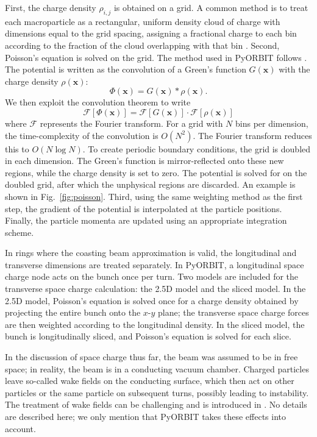 First, the charge density $\rho_{i,j}$ is obtained on a grid. A common method is to treat each macroparticle as a rectangular, uniform density cloud of charge with dimensions equal to the grid spacing, assigning a fractional charge to each bin according to the fraction of the cloud overlapping with that bin \cite{Birdsall1975}. Second, Poisson’s equation is solved on the grid. The method used in PyORBIT follows \cite{Hockney1981}. The potential is written as the convolution of a Green's function $G(\mathbf{x})$ with the charge density $\rho(\mathbf{x})$:
%
\begin{equation}
    \Phi(\mathbf{x}) = G(\mathbf{x}) * \rho(\mathbf{x}).
\end{equation}
%
We then exploit the convolution theorem \cite{Arfken1985} to write
%
\begin{equation}
    \mathcal{F}[\Phi(\mathbf{x})]
    =
    \mathcal{F}[G(\mathbf{x})] \cdot \mathcal{F}[\rho(\mathbf{x})]
\end{equation}
%
where $\mathcal{F}$ represents the Fourier transform. For a grid with $N$ bins per dimension, the time-complexity of the convolution is $O(N^2)$. The Fourier transform reduces this to $O(N \log N)$. To create periodic boundary conditions, the grid is doubled in each dimension. The Green's function is mirror-reflected onto these new regions, while the charge density is set to zero. The potential is solved for on the doubled grid, after which the unphysical regions are discarded. An example is shown in Fig.~\ref{fig:poisson}. Third, using the same weighting method as the first step, the gradient of the potential is interpolated at the particle positions. Finally, the particle momenta are updated using an appropriate integration scheme. 

In rings where the coasting beam approximation is valid, the longitudinal and transverse dimensions are treated separately. In PyORBIT, a longitudinal space charge node acts on the bunch once per turn. Two models are included for the transverse space charge calculation: the 2.5D model and the sliced model. In the 2.5D model, Poisson’s equation is solved once for a charge density obtained by projecting the entire bunch onto the $x$-$y$ plane; the transverse space charge forces are then weighted according to the longitudinal density. In the sliced model, the bunch is longitudinally sliced, and Poisson’s equation is solved for each slice.

In the discussion of space charge thus far, the beam was assumed to be in free space; in reality, the beam is in a conducting vacuum chamber. Charged particles leave so-called wake fields on the conducting surface, which then act on other particles or the same particle on subsequent turns, possibly leading to instability. The treatment of wake fields can be challenging and is introduced in \cite{Chao1993}. No details are described here; we only mention that PyORBIT takes these effects into account.



